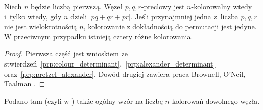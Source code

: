 \begin{proposition}
%
    Niech $n$ będzie liczbą pierwszą.
    Węzeł $p, q, r$-preclowy jest $n$-kolorowalny wtedy i~tylko wtedy, gdy $n$ dzieli $|pq+qr+pr|$.
    Jeśli przynajmniej jedna z~liczba $p, q, r$ nie jest wielokrotnością $n$, kolorowanie z dokładnością do permutacji jest jedyne.
    W przeciwnym przypadku istnieją cztery różne kolorowania.
\end{proposition}

\begin{proof}
%
%
%
    Pierwsza część jest wnioskiem ze stwierdzeń~\ref{prp:colour_determinant},~\ref{prp:alexander_determinant} oraz~\ref{prp:pretzel_alexander}.
    Dowód drugiej zawiera praca Brownell, O'Neil, Taalman \cite[s. 11]{taalman2005}.
\end{proof}

Podano tam (czyli w \cite{taalman2005}) także ogólny wzór na liczbę $n$-kolorowań dowolnego węzła.

%


